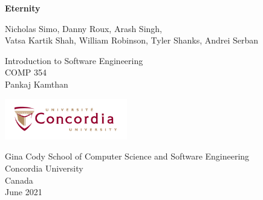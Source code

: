 \begin{titlepage}
   \begin{center}
       \vspace*{1cm}

       \Huge
       \textbf{Eternity}

        \vspace{0.5cm}
        \Large
        Nicholas Simo, Danny Roux, Arash Singh,
        \\Vatsa Kartik Shah, William Robinson, Tyler Shanks, Andrei Serban
       
       \vspace{6cm}
        Introduction to Software Engineering
        \\COMP 354
        \\Pankaj Kamthan

        
       \vspace{1.5cm}
        
        \Large

       \vfill
            
       \vspace{0.8cm}
     
       \includegraphics[width=0.4\textwidth]{images/concologo.png}

       Gina Cody School of Computer Science and Software Engineering\\
       Concordia University\\
       Canada\\
       June 2021
            
   \end{center}
\end{titlepage}
